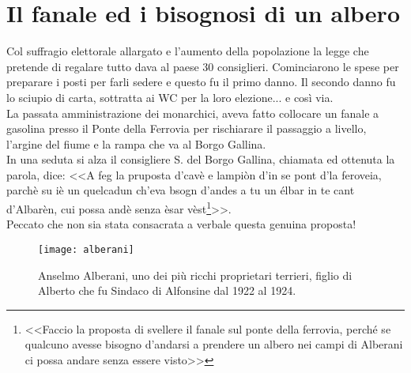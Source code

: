 
\chapter{Il fanale ed i bisognosi di un albero}
Col suffragio elettorale allargato e l'aumento della popolazione la legge che pretende di regalare tutto dava al paese 30 consiglieri. Cominciarono le spese per preparare i posti per farli sedere e questo fu il primo danno. Il secondo danno fu lo sciupio di carta, sottratta ai WC per la loro elezione... e così via.\\
\indent La passata amministrazione dei monarchici, aveva fatto collocare un fanale a gasolina presso il Ponte della Ferrovia per rischiarare il passaggio a livello, l'argine del fiume e la rampa che va al Borgo Gallina.\\
\indent In una seduta si alza il consigliere S.\: \: del Borgo Gallina, chiamata ed ottenuta la parola, dice: <<A feg la pruposta d'cavè e lampiòn d'in se pont d'la feroveia, parchè su iè un quelcadun ch'eva bsogn d'andes a tu un élbar in te cant d'Albarèn, cui possa andè senza èsar vèst\footnote{<<Faccio la proposta di svellere il fanale sul ponte della ferrovia, perché se qualcuno avesse bisogno d'andarsi a prendere un albero nei campi di Alberani ci possa andare senza essere visto>>}>>.\\
\indent Peccato che non sia stata consacrata a verbale questa genuina proposta!

 \begin{figure}[htb]
    \centering
    \texttt{[image: alberani]}
    \caption*{Anselmo Alberani, uno dei più ricchi proprietari terrieri, figlio di Alberto che fu Sindaco di Alfonsine dal 1922 al 1924.\label{fig:alberani}}
\end{figure}